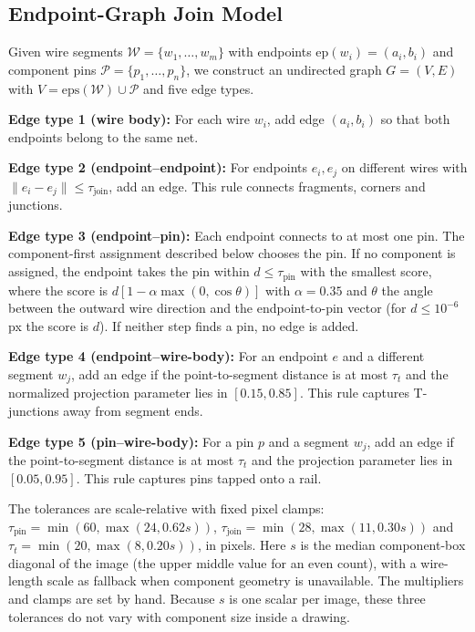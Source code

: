 \documentclass{ieeeaccess}
\begin{document}
\subsection{Endpoint-Graph Join Model}
\label{sec:join_model}

Given wire segments $\mathcal{W} = \{w_1, \ldots, w_m\}$ with endpoints $\text{ep}(w_i) = (a_i, b_i)$ and component pins $\mathcal{P} = \{p_1, \ldots, p_n\}$, we construct an undirected graph $G = (V, E)$ with $V = \text{eps}(\mathcal{W}) \cup \mathcal{P}$ and five edge types.

\textbf{Edge type 1 (wire body):} For each wire $w_i$, add edge $(a_i,b_i)$ so that both endpoints belong to the same net.

\textbf{Edge type 2 (endpoint--endpoint):} For endpoints $e_i,e_j$ on different wires with $\|e_i-e_j\|\leq\tau_{\text{join}}$, add an edge. This rule connects fragments, corners and junctions.

\textbf{Edge type 3 (endpoint--pin):} Each endpoint connects to at most one pin. The component-first assignment described below chooses the pin. If no component is assigned, the endpoint takes the pin within $d\leq\tau_{\text{pin}}$ with the smallest score, where the score is $d[1-\alpha\max(0,\cos\theta)]$ with $\alpha=0.35$ and $\theta$ the angle between the outward wire direction and the endpoint-to-pin vector (for $d\le10^{-6}$\,px the score is $d$). If neither step finds a pin, no edge is added.

\textbf{Edge type 4 (endpoint--wire-body):} For an endpoint $e$ and a different segment $w_j$, add an edge if the point-to-segment distance is at most $\tau_t$ and the normalized projection parameter lies in $[0.15,0.85]$. This rule captures T-junctions away from segment ends.

\textbf{Edge type 5 (pin--wire-body):} For a pin $p$ and a segment $w_j$, add an edge if the point-to-segment distance is at most $\tau_t$ and the projection parameter lies in $[0.05,0.95]$. This rule captures pins tapped onto a rail.

The tolerances are scale-relative with fixed pixel clamps: $\tau_{\text{pin}}=\min(60,\max(24,0.62s))$, $\tau_{\text{join}}=\min(28,\max(11,0.30s))$ and $\tau_t=\min(20,\max(8,0.20s))$, in pixels. Here $s$ is the median component-box diagonal of the image (the upper middle value for an even count), with a wire-length scale as fallback when component geometry is unavailable. The multipliers and clamps are set by hand. Because $s$ is one scalar per image, these three tolerances do not vary with component size inside a drawing.
\end{document}

